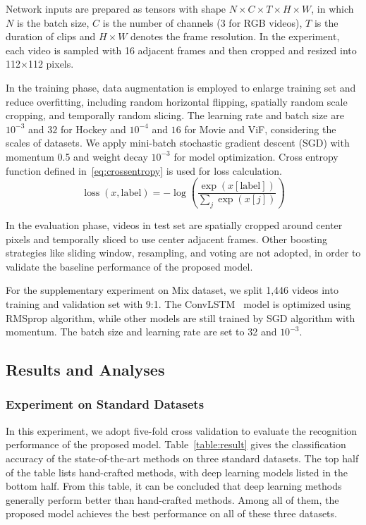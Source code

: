 \documentclass[10pt,twocolumn,letterpaper]{article}
\begin{document}
Network inputs are prepared as tensors with shape $N \times C \times T \times H \times W$, in which $N$ is the batch size, $C$ is the number of channels (3 for RGB videos), $T$ is the duration of clips and $H \times W$ denotes the frame resolution. 
In the experiment, each video is sampled with 16 adjacent frames and then cropped and resized into 112$\times$112 pixels.

In the training phase, data augmentation is employed to enlarge training set and reduce overfitting, including random horizontal flipping, spatially random scale cropping, and temporally random slicing. 
The learning rate and batch size are $10^{-3}$ and $32$ for Hockey and $10^{-4}$ and $16$ for Movie and ViF, considering the scales of datasets.
We apply mini-batch stochastic gradient descent (SGD) with momentum 0.5 and weight decay $10^{-3}$ for model optimization.  
Cross entropy function defined in~\ref{eq:crossentropy} is used for loss calculation. 
\begin{equation}
\label{eq:crossentropy}
\operatorname{loss}(x, \text{label}) = -\log \left(\frac{\exp (x[\text{label}])}{\sum_{j} \exp (x[j])}\right)
\end{equation}

In the evaluation phase, videos in test set are spatially cropped around center pixels and temporally sliced to use center adjacent frames.
Other boosting strategies like sliding window, resampling, and voting are not adopted, in order to validate the baseline performance of the proposed model.

For the supplementary experiment on Mix dataset, we split 1,446 videos into training and validation set with 9:1. 
The ConvLSTM~\cite{convlstm_sudh} model is optimized using RMSprop algorithm, while other models are still trained by SGD algorithm with momentum.
The batch size and learning rate are set to 32 and $10^{-3}$.

\subsection{Results and Analyses}

\subsubsection{Experiment on Standard Datasets}

In this experiment, we adopt five-fold cross validation to evaluate the recognition performance of the proposed model.
Table~\ref{table:result} gives the classification accuracy of the state-of-the-art methods on three standard datasets.
The top half of the table lists hand-crafted methods, with deep learning models listed in the bottom half.
From this table, it can be concluded that deep learning methods generally perform better than hand-crafted methods.
Among all of them, the proposed model achieves the best performance on all of these three datasets.
\end{document}
